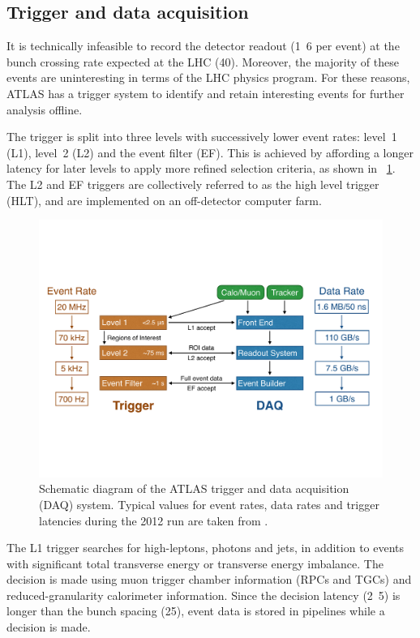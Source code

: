 \subsection{Trigger and data acquisition}
\label{sec:atlas:trig}

It is technically infeasible to record the detector readout (\unit{1.6}{\mega\bel} per 
event) at the bunch crossing rate expected at the LHC (\unit{40}{\mega\hertz}).
Moreover, the majority of these events are uninteresting in terms of the LHC physics 
program. For these reasons, ATLAS has a trigger system to identify and retain interesting
events for further analysis offline.

The trigger is split into three levels with successively lower event rates: level~1 (L1), 
level~2 (L2) and the event filter (EF). This is achieved by affording a longer latency 
for later levels to apply more refined selection criteria, as shown in 
\Figure~\ref{fig:trigger}. The L2 and EF triggers are collectively referred to as the 
high level trigger (HLT), and are implemented on an off-detector computer farm.

\begin{figure}[t]
	\includegraphics[width=\textwidth,clip=true,trim=0.9cm 6.8cm 1.4cm 6.8cm]{custom_images/trigger}
	\caption{Schematic diagram of the ATLAS trigger and data acquisition (DAQ) system.
	Typical values for event rates, data rates and trigger latencies during the 2012 run 
	are taken from \cite{TriggerNumbers}.}
	\label{fig:trigger}
\end{figure}

The L1 trigger searches for high-\pt leptons, photons and jets, in addition to 
events with significant total transverse energy or transverse energy imbalance. The 
decision is made using muon trigger chamber information (RPCs and TGCs) and 
reduced-granularity calorimeter information. Since the decision latency 
(\unit{2.5}{\micro\second}) is longer than the bunch spacing (\unit{25}{\nano\second}),
event data is stored in pipelines while a decision is made.

